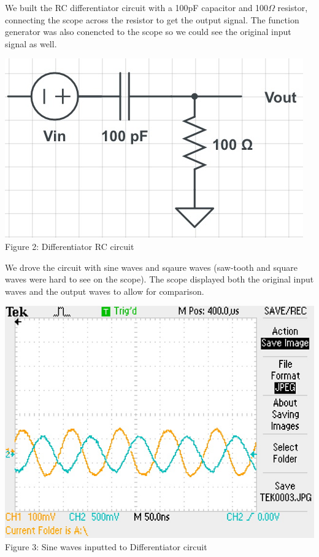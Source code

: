 \documentclass[]{article}
\begin{document}
We built the RC differentiator circuit with a 100pF capacitor and 100$\Omega$ resistor, connecting the scope across the resistor to get the output signal. The function generator was also conencted to the scope so we could see the original input signal as well. 
\begin{center}
	\includegraphics[scale=0.4]{lab2_differentiator}\\
	Figure 2: Differentiator RC circuit
\end{center}
	We drove the circuit with sine waves and sqaure waves (saw-tooth and square waves were hard to see on the scope). The scope displayed both the original input waves and the output waves to allow for comparison. 
	\begin{center}
		\includegraphics[scale=1]{lab2_c_sine}\\
		Figure 3: Sine waves inputted to Differentiator circuit
	\end{center}
\end{document}
